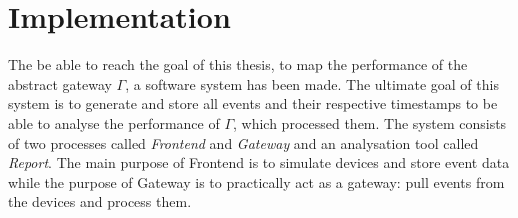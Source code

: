 \chapter{Implementation}

The be able to reach the goal of this thesis, to map the performance of the
abstract gateway $\Gamma$, a software system has been made. The ultimate goal
of this system is to generate and store all events and their respective
timestamps to be able to analyse the performance of $\Gamma$, which processed
them. The system consists of two processes called \textit{Frontend} and
\textit{Gateway} and an analysation tool called \textit{Report}. The main
purpose of Frontend is to simulate devices and store event data while the
purpose of Gateway is to practically act as a gateway: pull events from the
devices and process them.

